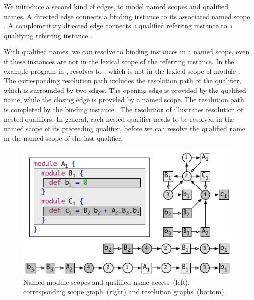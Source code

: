 We introduce a second kind of edges, to model named scopes and qualified names.
A directed edge  connects 
  a binding instance  
  to its associated named scope .
A complementary directed edge  connects 
  a qualified referring instance  
  to a qualifying referring instance .
  
With qualified names, we can resolve to binding instances in a named scope, 
  even if these instances are not in the lexical scope of the referring instance.
In the example program in ,  resolves to
  , which is not in the lexical scope of module .
The corresponding resolution path includes the resolution path of the qualifier, 
  which is surrounded by two  edges.
The opening edge   
  is provided by the qualified name, 
  while the closing edge  
  is provided by a named scope.
The resolution path is completed by the binding instance .
%
The resolution of  illustrates resolution of nested qualifiers.
In general, each nested qualifier needs to be resolved in the named scope of its preceeding qualifier, 
  before we can resolve the qualified name in the named scope of the last qualifier.
  
\begin{figure}[t]
\begin{center}
  \includegraphics[trim=0.175cm 0cm 0cm 0cm]{figures/scope-graphs/qualified/example2}
  \vspace{0.35cm}
  
  \includegraphics{figures/scope-graphs/qualified/resolution2}
  \caption{Named module scopes and qualified name access~(left), corresponding scope graph~(right) and resolution graphs~(bottom).}
\end{center}
\end{figure}


